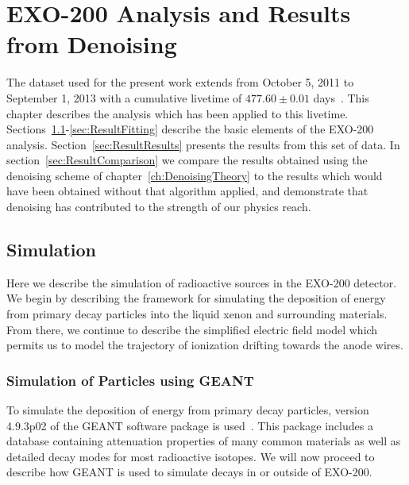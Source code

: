 \renewcommand{\thechapter}{7}
\chapter{EXO-200 Analysis and Results from Denoising}
\label{ch:DenoisingResults}

The dataset used for the present work extends from October 5, 2011 to September 1, 2013 with a cumulative livetime of $477.60 \pm 0.01$ days~\cite{NewEXObb0nPaper_2014}.  This chapter describes the analysis which has been applied to this livetime.  Sections~\ref{sec:ResultSimulation}-\ref{sec:ResultFitting} describe the basic elements of the EXO-200 analysis.  Section~\ref{sec:ResultResults} presents the results from this set of data.  In section~\ref{sec:ResultComparison} we compare the results obtained using the denoising scheme of chapter~\ref{ch:DenoisingTheory} to the results which would have been obtained without that algorithm applied, and demonstrate that denoising has contributed to the strength of our physics reach.

\section{Simulation}\label{sec:ResultSimulation}

Here we describe the simulation of radioactive sources in the EXO-200 detector.  We begin by describing the framework for simulating the deposition of energy from primary decay particles into the liquid xenon and surrounding materials.  From there, we continue to describe the simplified electric field model which permits us to model the trajectory of ionization drifting towards the anode wires.

\subsection{Simulation of Particles using GEANT}

To simulate the deposition of energy from primary decay particles, version 4.9.3p02 of the GEANT software package is used~\cite{Agostinelli2003250,1610988}.  This package includes a database containing attenuation properties of many common materials as well as detailed decay modes for most radioactive isotopes.  We will now proceed to describe how GEANT is used to simulate decays in or outside of EXO-200.

